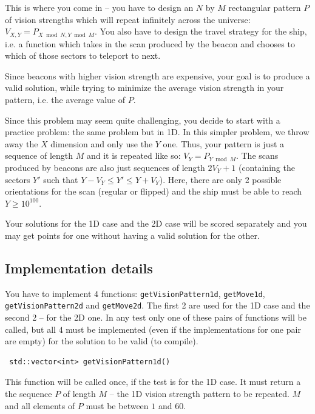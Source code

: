 \documentclass[12pt]{article}
\begin{document}
This is where you come in -- you have to design an $N$ by $M$ rectangular pattern $P$ of vision strengths which will repeat infinitely across the universe: $V_{X, Y} = P_{X \bmod N, Y \bmod M}$. You also have to design the travel strategy for the ship, i.e. a function which takes in the scan produced by the beacon and chooses to which of those sectors to teleport to next.

Since beacons with higher vision strength are expensive, your goal is to produce a valid solution, while trying to minimize the average vision strength in your pattern, i.e. the average value of $P$.

Since this problem may seem quite challenging, you decide to start with a practice problem: the same problem but in 1D. In this simpler problem, we throw away the $X$ dimension and only use the $Y$ one. Thus, your pattern is just a sequence of length $M$ and it is repeated like so: $V_Y = P_{Y \bmod M}$. The scans produced by beacons are also just sequences of length $2V_Y + 1$ (containing the sectors $Y'$ such that  $Y - V_{Y} \leq Y' \leq Y + V_{Y}$). Here, there are only 2 possible orientations for the scan (regular or flipped) and the ship must be able to reach $Y \geq 10^{100}$.

Your solutions for the 1D case and the 2D case will be scored separately and you may get points for one without having a valid solution for the other.

\subsection{Implementation details}

You have to implement 4 functions: \verb|getVisionPattern1d|, \verb|getMove1d|, \verb|getVisionPattern2d| and \verb|getMove2d|. The first 2 are used for the 1D case and the second 2 -- for the 2D one. In any test only one of these pairs of functions will be called, but all 4 must be implemented (even if the implementations for one pair are empty) for the solution to be valid (to compile).

\begin{lstlisting}
 std::vector<int> getVisionPattern1d()
\end{lstlisting}

This function will be called once, if the test is for the 1D case. It must return a the sequence $P$ of length $M$ -- the 1D vision strength pattern to be repeated. $M$ and all elements of $P$ must be between $1$ and $60$.
\end{document}
